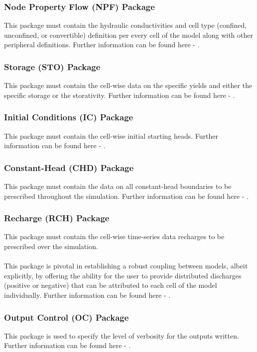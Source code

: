 \subsubsection*{Node Property Flow (NPF) Package}
This package must contain the hydraulic conductivities and cell type (confined, unconfined, or convertible) definition per every cell of the model along with other peripheral definitions.
Further information can be found here - \cite[p.~44]{USGS2018}.

\subsubsection*{Storage (STO) Package}
This package must contain the cell-wise data on the specific yields and either the specific storage or the storativity.
Further information can be found here - \cite[p.~50]{USGS2018}.

\subsubsection*{Initial Conditions (IC) Package}
This package must contain the cell-wise initial starting heads.
Further information can be found here - \cite[p.~161]{USGS2018}.

\subsubsection*{Constant-Head (CHD) Package}
This package must contain the data on all constant-head boundaries to be prescribed throughout the simulation.
Further information can be found here - \cite[p.~66]{USGS2018}.

\subsubsection*{Recharge (RCH) Package}
This package must contain the cell-wise time-series data recharges to be prescribed over the simulation.
\\ \\
This package is pivotal in establishing a robust coupling between models, albeit explicitly, by offering the ability for the user to provide distributed discharges (positive or negative) that can be attributed to each cell of the model individually.
Further information can be found here - \cite[p.~90]{USGS2018}.

\subsubsection*{Output Control (OC) Package}
This package is used to specify the level of verbosity for the outputs written.
Further information can be found here - \cite[p.~162]{USGS2018}.

